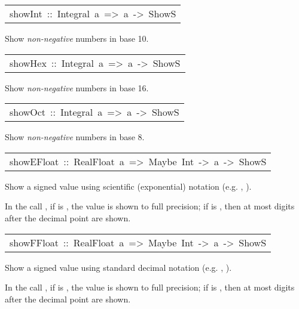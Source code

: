 \begin{haddockdesc}
\item[\begin{tabular}{@{}l}
showInt\ ::\ Integral\ a\ =>\ a\ ->\ ShowS
\end{tabular}]\haddockbegindoc
Show \emph{non-negative}  numbers in base 10.
\par

\end{haddockdesc}
\begin{haddockdesc}
\item[\begin{tabular}{@{}l}
showHex\ ::\ Integral\ a\ =>\ a\ ->\ ShowS
\end{tabular}]\haddockbegindoc
Show \emph{non-negative}  numbers in base 16.
\par

\end{haddockdesc}
\begin{haddockdesc}
\item[\begin{tabular}{@{}l}
showOct\ ::\ Integral\ a\ =>\ a\ ->\ ShowS
\end{tabular}]\haddockbegindoc
Show \emph{non-negative}  numbers in base 8.
\par

\end{haddockdesc}
\begin{haddockdesc}
\item[\begin{tabular}{@{}l}
showEFloat\ ::\ RealFloat\ a\ =>\ Maybe\ Int\ ->\ a\ ->\ ShowS
\end{tabular}]\haddockbegindoc
Show a signed  value
 using scientific (exponential) notation (e.g. , ).
\par
In the call , if  is ,
 the value is shown to full precision; if  is ,
 then at most  digits after the decimal point are shown.
\par

\end{haddockdesc}
\begin{haddockdesc}
\item[\begin{tabular}{@{}l}
showFFloat\ ::\ RealFloat\ a\ =>\ Maybe\ Int\ ->\ a\ ->\ ShowS
\end{tabular}]\haddockbegindoc
Show a signed  value
 using standard decimal notation (e.g. , ).
\par
In the call , if  is ,
 the value is shown to full precision; if  is ,
 then at most  digits after the decimal point are shown.
\par

\end{haddockdesc}
